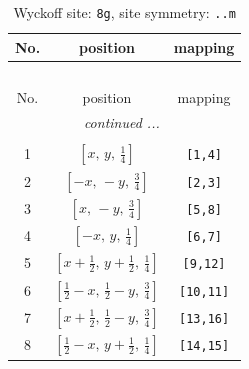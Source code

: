 \documentclass[fleqn,8pt]{jsarticle}
\begin{document}
\begin{longtable}{ccc}
\caption{Wyckoff site: {\tt 8g}, site symmetry: {\tt ..m}}
 \\
 \hline \hline
No. & position & mapping \\ \hline \endfirsthead

\multicolumn{2}{l}{\tablename\ \thetable{}} \\
 \hline \hline
No. & position & mapping \\ \hline \endhead

 \hline \hline
\multicolumn{2}{r}{\footnotesize\it continued ...} \\ \endfoot

 \hline \hline
\multicolumn{2}{r}{} \\ \endlastfoot

1 & $\left[ x,\, y,\, \frac{1}{4} \right]$ & {\tt [1,4]} \\ \hline
2 & $\left[ - x,\, - y,\, \frac{3}{4} \right]$ & {\tt [2,3]} \\ \hline
3 & $\left[ x,\, - y,\, \frac{3}{4} \right]$ & {\tt [5,8]} \\ \hline
4 & $\left[ - x,\, y,\, \frac{1}{4} \right]$ & {\tt [6,7]} \\ \hline
5 & $\left[ x + \frac{1}{2},\, y + \frac{1}{2},\, \frac{1}{4} \right]$ & {\tt [9,12]} \\ \hline
6 & $\left[ \frac{1}{2} - x,\, \frac{1}{2} - y,\, \frac{3}{4} \right]$ & {\tt [10,11]} \\ \hline
7 & $\left[ x + \frac{1}{2},\, \frac{1}{2} - y,\, \frac{3}{4} \right]$ & {\tt [13,16]} \\ \hline
8 & $\left[ \frac{1}{2} - x,\, y + \frac{1}{2},\, \frac{1}{4} \right]$ & {\tt [14,15]} \\
\end{longtable}
\renewcommand{\arraystretch}{1.2}
\end{document}
